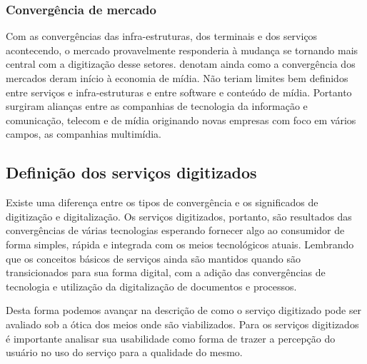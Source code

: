 \subsubsection{Convergência de mercado}

Com as convergências das infra-estruturas, dos terminais e dos serviços acontecendo, o mercado provavelmente responderia à mudança se tornando mais central com a digitização desse setores. \cite{storsul2010} denotam ainda como a convergência dos mercados deram início à economia de mídia. Não teriam limites bem definidos entre serviços e infra-estruturas e entre software e conteúdo de mídia. Portanto surgiram alianças entre as companhias de tecnologia da informação e comunicação, telecom e de mídia originando novas empresas com foco em vários campos, as companhias multimídia.

\subsection{Definição dos serviços digitizados}

Existe uma diferença entre os tipos de convergência e os significados de digitização e digitalização. Os serviços digitizados, portanto, são resultados das convergências de várias tecnologias esperando fornecer algo ao consumidor de forma simples, rápida e integrada com os meios tecnológicos atuais. Lembrando que os conceitos básicos de serviços ainda são mantidos quando são transicionados para sua forma digital, com a adição das convergências de tecnologia e utilização da digitalização de documentos e processos. 

Desta forma podemos avançar na descrição de como o serviço digitizado pode ser avaliado sob a ótica dos meios onde são viabilizados. Para os serviços digitizados é importante analisar sua usabilidade como forma de trazer a percepção do usuário no uso do serviço para a qualidade do mesmo.

